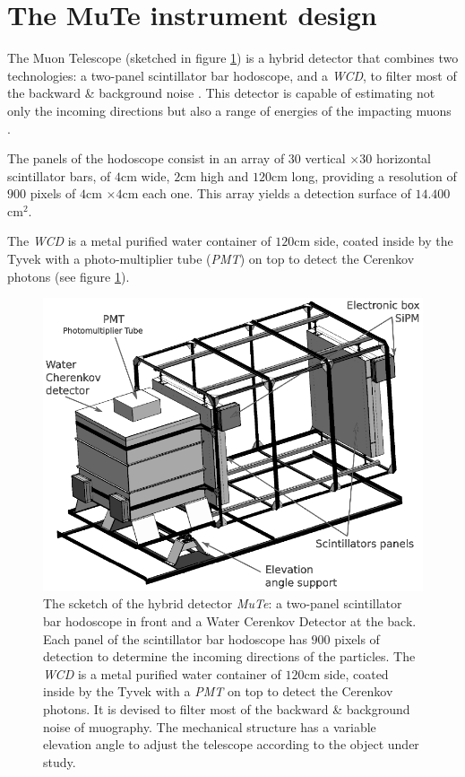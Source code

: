 \documentclass[submitting]{nst}
\begin{document}

\section{The MuTe instrument design}
The Muon Telescope (sketched in figure \ref{fig:mute-detector}) is a hybrid detector that combines two technologies: a two-panel scintillator bar hodoscope, and a \textsl{WCD}, to filter most of the backward \& background noise \cite{NishiyamaMiyamotoNaganawa2014, KusagayaTanaka2015, NishiyamaEtal2016, GomezEtal2017}. This detector is capable of estimating not only the incoming  directions but also a range of energies of the impacting muons \cite{AsoreyEtal2017B, PenarodriguezEtal2019}.
  
 The panels of the hodoscope consist in an array of $30$ vertical $\times 30$ horizontal scintillator bars, of $4$cm wide, $2$cm high and $120$cm long, providing a resolution of $900$ pixels of $4$cm $\times 4$cm each one. This array yields a detection surface of $14.400$cm$^2$. 
 
 The \textsl{WCD} is a metal purified water container of $120$cm side, coated inside by the Tyvek with a photo-multiplier tube (\textsl{PMT}) on top to detect the Cerenkov photons (see figure \ref{fig:mute-detector}).

\begin{figure}
    \centering
    \includegraphics[scale=0.3]{Figures/mute-detector.png}
    \caption{The scketch of the hybrid detector \textsl{MuTe}: a two-panel scintillator bar hodoscope in front and a Water Cerenkov Detector at the back. Each panel of the scintillator bar hodoscope has $900$ pixels of detection to determine the incoming directions of the particles. The \textsl{WCD} is a metal purified water container of $120$cm side, coated inside by the Tyvek with a \textsl{PMT} on top to detect the Cerenkov photons. It is devised to filter most of the backward \& background noise of muography. The mechanical structure has a variable elevation angle to adjust the telescope according to the object under study.} 
    \label{fig:mute-detector}
\end{figure}
\end{document}
